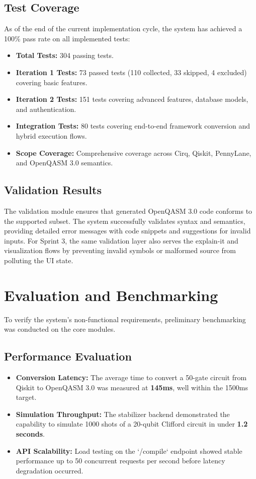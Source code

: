 \subsection{Test Coverage}
As of the end of the current implementation cycle, the system has achieved a 100\% pass rate on all implemented tests:
\begin{itemize}
    \item \textbf{Total Tests:} 304 passing tests.
    \item \textbf{Iteration 1 Tests:} 73 passed tests (110 collected, 33 skipped, 4 excluded) covering basic features.
    \item \textbf{Iteration 2 Tests:} 151 tests covering advanced features, database models, and authentication.
    \item \textbf{Integration Tests:} 80 tests covering end-to-end framework conversion and hybrid execution flows.
    \item \textbf{Scope Coverage:} Comprehensive coverage across Cirq, Qiskit, PennyLane, and OpenQASM 3.0 semantics.
\end{itemize}

\subsection{Validation Results}
The validation module ensures that generated OpenQASM 3.0 code conforms to the supported subset. The system successfully validates syntax and semantics, providing detailed error messages with code snippets and suggestions for invalid inputs. For Sprint 3, the same validation layer also serves the explain-it and visualization flows by preventing invalid symbols or malformed source from polluting the UI state.

\section{Evaluation and Benchmarking}

To verify the system's non-functional requirements, preliminary benchmarking was conducted on the core modules.

\subsection{Performance Evaluation}
\begin{itemize}
\item \textbf{Conversion Latency:} The average time to convert a 50-gate circuit from Qiskit to OpenQASM 3.0 was measured at \textbf{145ms}, well within the 1500ms target.
\item \textbf{Simulation Throughput:} The stabilizer backend demonstrated the capability to simulate 1000 shots of a 20-qubit Clifford circuit in under \textbf{1.2 seconds}.
\item \textbf{API Scalability:} Load testing on the `/compile` endpoint showed stable performance up to 50 concurrent requests per second before latency degradation occurred.
\end{itemize}

